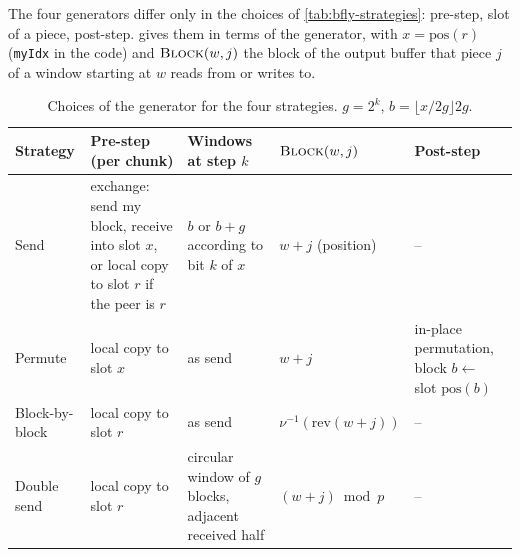 The four generators differ only in the choices of \cref{tab:bfly-strategies}: pre-step, slot of a piece, post-step.
 gives them in terms of the generator, with $x=\mathrm{pos}(r)$ (\texttt{myIdx} in the code) and $\textsc{Block}(w,j)$ the block of the output buffer that piece $j$ of a window starting at $w$ reads from or writes to.

\begin{table}[t]
\centering
\footnotesize
\setlength{\tabcolsep}{4pt}
\caption{Choices of the generator for the four strategies. $g=2^k$, $b=\lfloor x/2g\rfloor 2g$.}
\label{tab:pat-strategies}
\begin{tabularx}{\linewidth}{@{}l X X X X@{}}
\toprule
Strategy & Pre-step (per chunk) & Windows at step $k$ & $\textsc{Block}(w,j)$ & Post-step \\
\midrule
Send & exchange: send my block, receive into slot $x$, or local copy to slot $r$ if the peer is $r$ & $b$ or $b+g$ according to bit $k$ of $x$ & $w+j$ (position) & -- \\
Permute & local copy to slot $x$ & as send & $w+j$ & in-place permutation, block $b\leftarrow$ slot $\mathrm{pos}(b)$ \\
Block-by-block & local copy to slot $r$ & as send & $\nu^{-1}(\mathrm{rev}(w+j))$ & -- \\
Double send & local copy to slot $r$ & circular window of $g$ blocks, adjacent received half & $(w+j)\bmod p$ & -- \\
\bottomrule
\end{tabularx}
\end{table}

